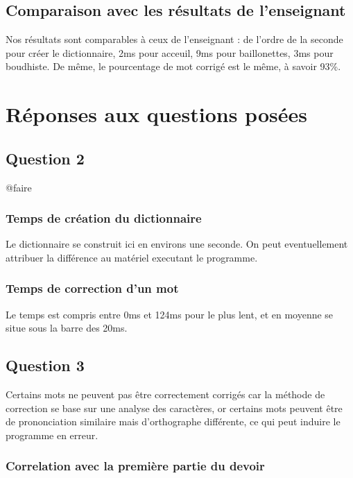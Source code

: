 \documentclass[french,12pt,a4]{report}
\begin{document}
\section{Comparaison avec les résultats de l'enseignant}

Nos résultats sont comparables à ceux de l'enseignant : de l'ordre de
la seconde pour créer le dictionnaire, 2ms pour acceuil, 9ms pour
baillonettes, 3ms pour boudhiste. De même, le pourcentage de mot
corrigé est le même, à savoir 93\%.
 

\chapter{Réponses aux questions posées}

\section{Question 2}

@faire

\subsection{Temps de création du dictionnaire}
Le dictionnaire se construit ici en environs une seconde. On peut
eventuellement attribuer la différence au matériel executant le programme.

\subsection{Temps de correction d'un mot}

Le temps est compris entre 0ms et 124ms pour le plus lent, et en
moyenne se situe sous la barre des 20ms.


\section{Question 3}

Certains mots ne peuvent pas être correctement corrigés car la méthode
de correction se base sur une analyse des caractères, or certains mots
peuvent être de prononciation similaire mais d'orthographe différente,
ce qui peut induire le programme en erreur.


\subsection{Correlation avec la première partie du devoir}
\end{document}
